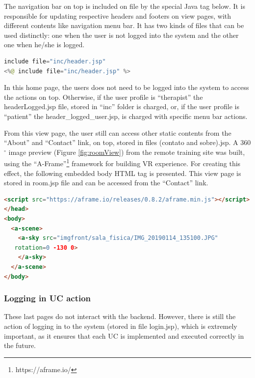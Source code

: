 The navigation bar on top is included on file by the special Java tag below. It is responsible for updating respective headers and footers on view pages, with different contents like navigation menu bar. It has two kinds of files that can be used distinctly: one when the user is not logged into the system and the other one when he/she is logged. \newline

\begin{lstlisting}[frame=single,language=Java]  % Start your code-block
include file="inc/header.jsp"
<%@ include file="inc/header.jsp" %>
\end{lstlisting}

In this home page, the users does not need to be logged into the system to access the actions on top. Otherwise, if the user profile is ``therapist'' the headerLogged.jsp file, stored in ``inc'' folder is charged, or, if the user profile is ``patient'' the header\_logged\_user.jsp, is charged with specific menu bar actions.

From this view page, the  user still can access other static contents from the  ``About'' and ``Contact'' link, on top, stored in files  (contato and sobre).jsp. A 360$^{\circ}$ image preview (Figure \ref{fig:roomView}) from the remote training site was built, using the ``A-Frame''\footnote{https://aframe.io/} framework for building VR experience. For creating this effect, the following embedded body HTML tag is presented. This view page is stored in room.jsp file and can be accessed from the ``Contact'' link.
\newline

\begin{lstlisting}[frame=single,language=HTML]  % Start your code-block
<script src="https://aframe.io/releases/0.8.2/aframe.min.js"></script>
</head>
<body>
  <a-scene> 
    <a-sky src="imgfront/sala_fisica/IMG_20190114_135100.JPG" 
   rotation=0 -130 0>
    </a-sky>
  </a-scene>
</body>
\end{lstlisting}


\subsubsection{Logging in UC action}
\label{sec:logginSystem}

These last pages do not interact with the backend. However, there is still the action of logging in to the system (stored in file login.jsp), which is extremely important, as it ensures that each UC is implemented and executed correctly in the future.


